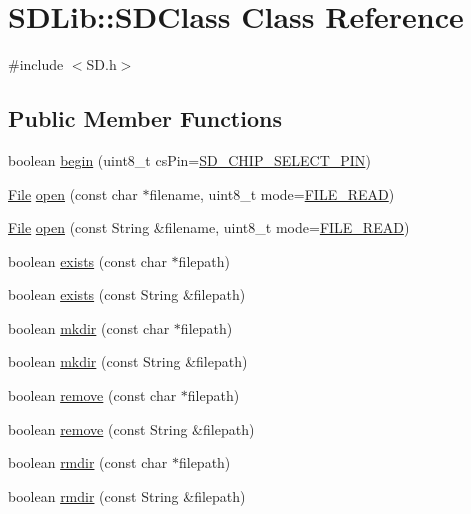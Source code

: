 \hypertarget{class_s_d_lib_1_1_s_d_class}{}\section{S\+D\+Lib\+:\+:S\+D\+Class Class Reference}
\label{class_s_d_lib_1_1_s_d_class}


{\ttfamily \#include $<$S\+D.\+h$>$}

\subsection*{Public Member Functions}
\begin{DoxyCompactItemize}
\item 
boolean \hyperlink{class_s_d_lib_1_1_s_d_class_a72fc9def5c1850b4b4bee984c6781c55}{begin} (uint8\+\_\+t cs\+Pin=\hyperlink{_sd2_card_8h_ae6b17538c14ba6c91ccb513db2c4c29c}{S\+D\+\_\+\+C\+H\+I\+P\+\_\+\+S\+E\+L\+E\+C\+T\+\_\+\+P\+IN})
\item 
\hyperlink{class_s_d_lib_1_1_file}{File} \hyperlink{class_s_d_lib_1_1_s_d_class_a1a29aa2a69d6feef59de059339648b3e}{open} (const char $\ast$filename, uint8\+\_\+t mode=\hyperlink{_s_d_8h_ad52d51659a75e25d96fb04d22ff718cb}{F\+I\+L\+E\+\_\+\+R\+E\+AD})
\item 
\hyperlink{class_s_d_lib_1_1_file}{File} \hyperlink{class_s_d_lib_1_1_s_d_class_a607c1d447434587e85b04efbdaf5c5cc}{open} (const String \&filename, uint8\+\_\+t mode=\hyperlink{_s_d_8h_ad52d51659a75e25d96fb04d22ff718cb}{F\+I\+L\+E\+\_\+\+R\+E\+AD})
\item 
boolean \hyperlink{class_s_d_lib_1_1_s_d_class_a0b362aab87a4f3c4cebe3b804c084311}{exists} (const char $\ast$filepath)
\item 
boolean \hyperlink{class_s_d_lib_1_1_s_d_class_a7c872a8f204d251e89f3f3236f0862fb}{exists} (const String \&filepath)
\item 
boolean \hyperlink{class_s_d_lib_1_1_s_d_class_aad36f5a3b1cdc102da62ee4f140f0324}{mkdir} (const char $\ast$filepath)
\item 
boolean \hyperlink{class_s_d_lib_1_1_s_d_class_a7403c4d32492205c78cf17c6786eb23a}{mkdir} (const String \&filepath)
\item 
boolean \hyperlink{class_s_d_lib_1_1_s_d_class_a000810a65b7b7eec2681879f4dfd8ea7}{remove} (const char $\ast$filepath)
\item 
boolean \hyperlink{class_s_d_lib_1_1_s_d_class_a525788a5a63c82ed54383be03fcd2ec7}{remove} (const String \&filepath)
\item 
boolean \hyperlink{class_s_d_lib_1_1_s_d_class_af50e54e0707bdf4ad74d197508d4382b}{rmdir} (const char $\ast$filepath)
\item 
boolean \hyperlink{class_s_d_lib_1_1_s_d_class_a8caabe5ca27eda8c747015b085fd3f94}{rmdir} (const String \&filepath)
\end{DoxyCompactItemize}
